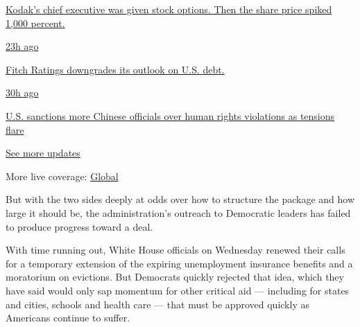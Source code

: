 \href{https://www.nytimes3xbfgragh.onion/live/2020/07/31/business/stock-market-today-coronavirus?action=click\&pgtype=Article\&state=default\&region=MAIN_CONTENT_1\&context=storylines_live_updates\#kodaks-chief-executive-was-given-stock-options-then-the-share-price-spiked-1000-percent}{Kodak's
chief executive was given stock options. Then the share price spiked
1,000 percent.}

\href{https://www.nytimes3xbfgragh.onion/live/2020/07/31/business/stock-market-today-coronavirus?action=click\&pgtype=Article\&state=default\&region=MAIN_CONTENT_1\&context=storylines_live_updates\#fitch-ratings-downgrades-its-outlook-on-us-debt}{23h
ago}

\href{https://www.nytimes3xbfgragh.onion/live/2020/07/31/business/stock-market-today-coronavirus?action=click\&pgtype=Article\&state=default\&region=MAIN_CONTENT_1\&context=storylines_live_updates\#fitch-ratings-downgrades-its-outlook-on-us-debt}{Fitch
Ratings downgrades its outlook on U.S. debt.}

\href{https://www.nytimes3xbfgragh.onion/live/2020/07/31/business/stock-market-today-coronavirus?action=click\&pgtype=Article\&state=default\&region=MAIN_CONTENT_1\&context=storylines_live_updates\#us-sanctions-more-chinese-officials-over-human-rights-violations-as-tensions-flare}{30h
ago}

\href{https://www.nytimes3xbfgragh.onion/live/2020/07/31/business/stock-market-today-coronavirus?action=click\&pgtype=Article\&state=default\&region=MAIN_CONTENT_1\&context=storylines_live_updates\#us-sanctions-more-chinese-officials-over-human-rights-violations-as-tensions-flare}{U.S.
sanctions more Chinese officials over human rights violations as
tensions flare}

\href{https://www.nytimes3xbfgragh.onion/live/2020/07/31/business/stock-market-today-coronavirus?action=click\&pgtype=Article\&state=default\&region=MAIN_CONTENT_1\&context=storylines_live_updates}{See
more updates}

More live coverage:
\href{https://www.nytimes3xbfgragh.onion/2020/08/01/world/coronavirus-covid-19.html?action=click\&pgtype=Article\&state=default\&region=MAIN_CONTENT_1\&context=storylines_live_updates}{Global}

But with the two sides deeply at odds over how to structure the package
and how large it should be, the administration's outreach to Democratic
leaders has failed to produce progress toward a deal.

With time running out, White House officials on Wednesday renewed their
calls for a temporary extension of the expiring unemployment insurance
benefits and a moratorium on evictions. But Democrats quickly rejected
that idea, which they have said would only sap momentum for other
critical aid --- including for states and cities, schools and health
care --- that must be approved quickly as Americans continue to suffer.

